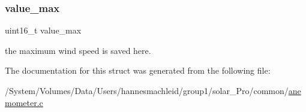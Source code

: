 \subsubsection{\texorpdfstring{value\_max}{value\_max}}
{\footnotesize\ttfamily uint16\+\_\+t value\+\_\+max}

the maximum wind speed is saved here. 

The documentation for this struct was generated from the following file\+:\begin{DoxyCompactItemize}
\item 
/\+System/\+Volumes/\+Data/\+Users/hannesmachleid/group1/solar\+\_\+\+Pro/common/\mbox{\hyperlink{anemometer_8c}{anemometer.\+c}}\end{DoxyCompactItemize}
